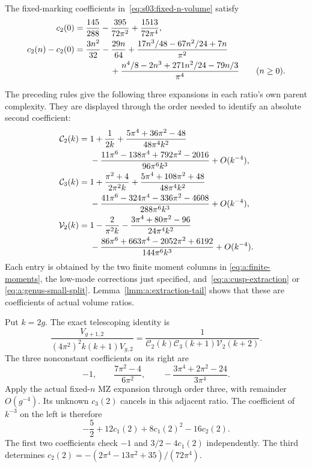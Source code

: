\begin{prp}\label{prp:a:c-two}
The fixed-marking coefficients in~\eqref{eq:s03:fixed-n-volume} satisfy
\begin{align}
 c_2(0)&=\frac{145}{288}-\frac{395}{72\pi^2}
                                  +\frac{1513}{72\pi^4},
 \label{eq:a:c-two-zero}\\
 c_2(n)-c_2(0)&=\frac{3n^2}{32}-\frac{29n}{64}
 +\frac{17n^3/48-67n^2/24+7n}{\pi^2}\notag\\
 &\hspace{15mm}
 +\frac{n^4/8-2n^3+271n^2/24-79n/3}{\pi^4}
 \qquad(n\geq0).
 \label{eq:a:c-two-n}
\end{align}
\end{prp}
\begin{prf}
The preceding rules give the following three expansions in each ratio's
own parent complexity. They are displayed through the order needed to
identify an absolute second coefficient:
\begin{align}
 \mathcal C_2(k)={}&1+\frac1{2k}
 +\frac{5\pi^4+36\pi^2-48}{48\pi^4k^2}\notag\\
 &-\frac{11\pi^6-138\pi^4+792\pi^2-2016}{96\pi^6k^3}
 +O(k^{-4}),\notag\\
 \mathcal C_3(k)={}&1+\frac{\pi^2+4}{2\pi^2k}
 +\frac{5\pi^4+108\pi^2+48}{48\pi^4k^2}\notag\\
 &-\frac{41\pi^6-324\pi^4-336\pi^2-4608}{288\pi^6k^3}
 +O(k^{-4}),\notag\\
 \mathcal V_2(k)={}&1-\frac2{\pi^2k}
 -\frac{3\pi^4+80\pi^2-96}{24\pi^4k^2}\notag\\
 &-\frac{86\pi^6+663\pi^4-2052\pi^2+6192}{144\pi^6k^3}
 +O(k^{-4}).
 \label{eq:a:three-ratios}
\end{align}
Each entry is obtained by the two finite moment columns in
\eqref{eq:a:finite-moments}, the low-mode corrections just specified,
and~\eqref{eq:a:cusp-extraction} or
\eqref{eq:a:genus-small-split}. Lemma~\ref{lmm:a:extraction-tail}
shows that these are coefficients of actual volume ratios.

Put $k=2g$. The exact telescoping identity is
\begin{equation}\label{eq:a:adjacent-genus-match}
 \frac{V_{g+1,2}}{(4\pi^2)^2 k(k+1)V_{g,2}}
 =\frac1{\mathcal C_2(k)\mathcal C_3(k+1)\mathcal V_2(k+2)}.
\end{equation}
The three nonconstant coefficients on its right are
\[
 -1,\qquad \frac{7\pi^2-4}{6\pi^2},\qquad
                    -\frac{3\pi^4+2\pi^2-24}{3\pi^4}.
\]
Apply the actual fixed-$n$ MZ expansion through order three, with
remainder $O(g^{-4})$. Its unknown $c_3(2)$ cancels in this adjacent
ratio. The coefficient of $k^{-3}$ on the left is therefore
\[
 -\frac52+12c_1(2)+8c_1(2)^2-16c_2(2).
\]
The first two coefficients check $-1$ and $3/2-4c_1(2)$ independently.
The third determines
$c_2(2)=-(2\pi^4-13\pi^2+35)/(72\pi^4)$.


\end{prf}

